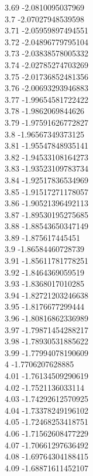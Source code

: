 {3.69	-2.0810095037969\\
3.7	-2.07027948539598\\
3.71	-2.05959897494551\\
3.72	-2.04896779795104\\
3.73	-2.03838578005332\\
3.74	-2.02785274703269\\
3.75	-2.01736852481356\\
3.76	-2.00693293946883\\
3.77	-1.99654581722422\\
3.78	-1.9862069844626\\
3.79	-1.97591626772827\\
3.8	-1.96567349373125\\
3.81	-1.95547848935141\\
3.82	-1.94533108164273\\
3.83	-1.93523109783734\\
3.84	-1.92517836534969\\
3.85	-1.91517271178057\\
3.86	-1.90521396492113\\
3.87	-1.89530195275685\\
3.88	-1.88543650347149\\
3.89	-1.875617445451\\
3.9	-1.86584460728739\\
3.91	-1.85611781778251\\
3.92	-1.8464369059519\\
3.93	-1.8368017010285\\
3.94	-1.82721203246638\\
3.95	-1.8176677299444\\
3.96	-1.80816862336989\\
3.97	-1.79871454288217\\
3.98	-1.78930531885622\\
3.99	-1.77994078190609\\
4	-1.7706207628885\\
4.01	-1.76134509290619\\
4.02	-1.7521136033114\\
4.03	-1.74292612570925\\
4.04	-1.73378249196102\\
4.05	-1.72468253418751\\
4.06	-1.71562608477229\\
4.07	-1.70661297636492\\
4.08	-1.69764304188415\\
4.09	-1.68871611452107\\
}
